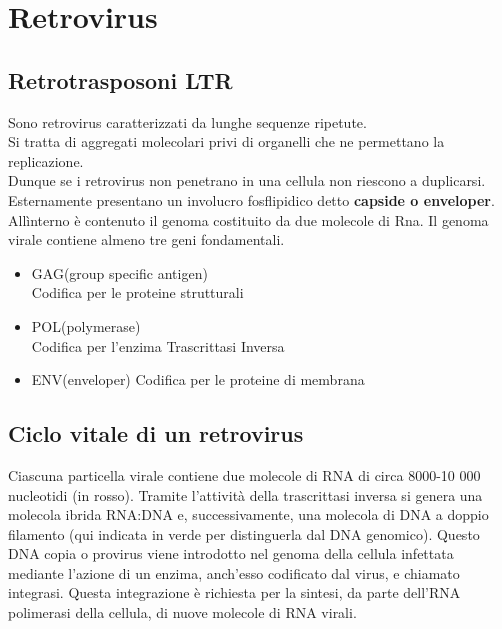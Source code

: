 \documentclass{article}
\begin{document}
\section{Retrovirus}
\subsection{Retrotrasposoni LTR}
Sono retrovirus caratterizzati da lunghe sequenze ripetute.\\
Si tratta di aggregati molecolari privi di organelli che ne permettano la replicazione.\\
Dunque se i retrovirus non penetrano in una cellula non riescono a duplicarsi.\\
Esternamente presentano un involucro fosflipidico detto \textbf{capside o enveloper}. Allìnterno è contenuto il genoma costituito da due molecole di Rna.
Il genoma virale contiene almeno tre geni fondamentali.
\begin{itemize}
    \item GAG(group specific antigen)\\
    Codifica per le proteine strutturali
    \item POL(polymerase)\\
    Codifica per l'enzima Trascrittasi Inversa
    \item ENV(enveloper)
    Codifica per le proteine di membrana
\end{itemize}
\subsection{Ciclo vitale di un retrovirus}
Ciascuna particella
virale contiene due molecole di RNA di circa
8000-10 000 nucleotidi (in rosso). Tramite
l'attività della trascrittasi inversa si genera una
molecola ibrida RNA:DNA e, successivamente,
una molecola di DNA a doppio filamento (qui
indicata in verde per distinguerla dal DNA
genomico). Questo DNA copia o provirus
viene introdotto nel genoma della cellula
infettata mediante l'azione di un enzima,
anch'esso codificato dal virus, e chiamato
integrasi. Questa integrazione è richiesta per
la sintesi, da parte dell'RNA polimerasi della
cellula, di nuove molecole di RNA virali.
\end{document}
